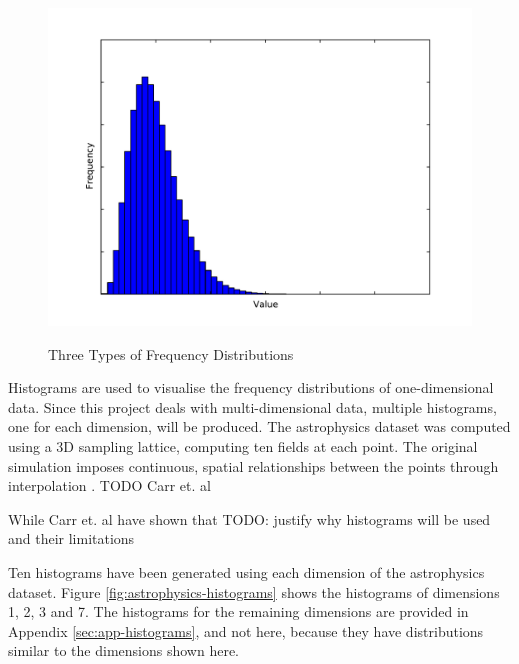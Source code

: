 \begin{figure}
\begin{center}
		\begin{subfloat} {%
			\includegraphics[scale=0.25]{figures/freqdist_gamma.pdf}
		}
		\end{subfloat}
	\end{center}

	\caption{Three Types of Frequency Distributions}
	\label{fig:frequency-distributions}
\end{figure}

Histograms are used to visualise the frequency distributions of one-dimensional data. Since this project deals with multi-dimensional data, multiple histograms, one for each dimension, will be produced. The astrophysics dataset was computed using a 3D sampling lattice, computing ten fields at each point. The original simulation imposes continuous, spatial relationships between the points through interpolation \cite{TODO}. TODO Carr et. al \cite{histograms-and-isosurfaces}

While Carr et. al have shown that   TODO: justify why histograms will be used and their limitations

Ten histograms have been generated using each dimension of the astrophysics dataset. Figure \ref{fig:astrophysics-histograms} shows the histograms of dimensions 1, 2, 3 and 7. The histograms for the remaining dimensions are provided in Appendix \ref{sec:app-histograms}, and not here, because they have distributions similar to the dimensions shown here.

